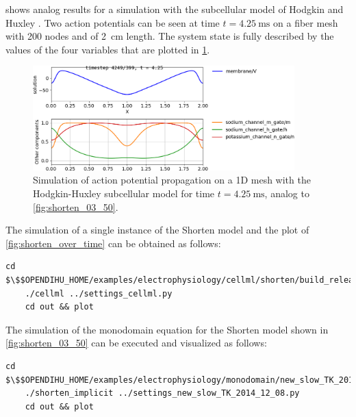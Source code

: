  shows analog results for a simulation with the subcellular model of Hodgkin and Huxley \cite{Hodgkin1952}. Two action potentials can be seen  at time $t=\SI{4.25}{\ms}$ on a fiber mesh with 200 nodes and of \SI{2}{\cm} length. The system state is fully described by the values of the four variables that are plotted in \cref{fig:hodgkin_huxley_over_mesh}.

\begin{figure}
  \centering%
  \includegraphics[width=0.9\textwidth]{images/results/basic/hodgkin_huxley_over_mesh.png}%
  \caption{Simulation of action potential propagation on a 1D mesh with the Hodgkin-Huxley subcellular model for time $t=\SI{4.25}{\ms}$, analog to \cref{fig:shorten_03_50}.}%
  \label{fig:hodgkin_huxley_over_mesh}%
\end{figure}%

\begin{reproduce_no_break}
  The simulation of a single instance of the Shorten model and the plot of \cref{fig:shorten_over_time} can be obtained as follows:
  \begin{lstlisting}[columns=fullflexible,breaklines=true,postbreak=\mbox{\textcolor{gray}{$\hookrightarrow$}\space}]
    cd $\$$OPENDIHU_HOME/examples/electrophysiology/cellml/shorten/build_release
    ./cellml ../settings_cellml.py
    cd out && plot
  \end{lstlisting}
  The simulation of the monodomain equation for the Shorten model shown in \cref{fig:shorten_03_50} can be executed and visualized as follows: 
  \begin{lstlisting}[columns=fullflexible,breaklines=true,postbreak=\mbox{\textcolor{gray}{$\hookrightarrow$}\space}]
    cd $\$$OPENDIHU_HOME/examples/electrophysiology/monodomain/new_slow_TK_2014_12_08/build_release
    ./shorten_implicit ../settings_new_slow_TK_2014_12_08.py
    cd out && plot
  \end{lstlisting}
\end{reproduce_no_break}

